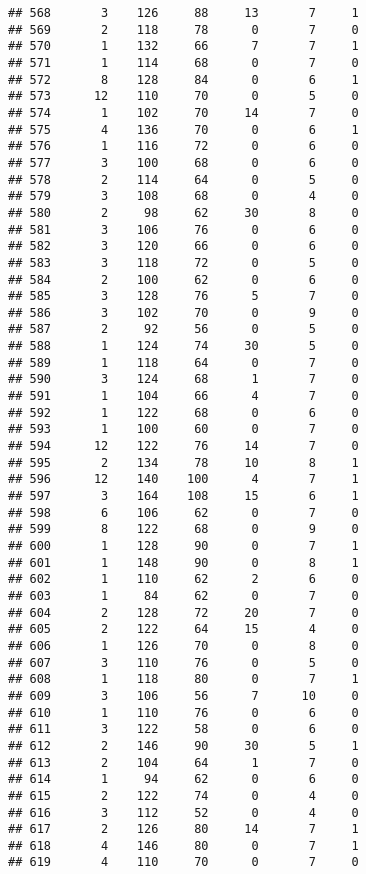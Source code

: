 \documentclass[
]{article}
\begin{document}
\begin{verbatim}
## 568       3    126     88     13       7     1
## 569       2    118     78      0       7     0
## 570       1    132     66      7       7     1
## 571       1    114     68      0       7     0
## 572       8    128     84      0       6     1
## 573      12    110     70      0       5     0
## 574       1    102     70     14       7     0
## 575       4    136     70      0       6     1
## 576       1    116     72      0       6     0
## 577       3    100     68      0       6     0
## 578       2    114     64      0       5     0
## 579       3    108     68      0       4     0
## 580       2     98     62     30       8     0
## 581       3    106     76      0       6     0
## 582       3    120     66      0       6     0
## 583       3    118     72      0       5     0
## 584       2    100     62      0       6     0
## 585       3    128     76      5       7     0
## 586       3    102     70      0       9     0
## 587       2     92     56      0       5     0
## 588       1    124     74     30       5     0
## 589       1    118     64      0       7     0
## 590       3    124     68      1       7     0
## 591       1    104     66      4       7     0
## 592       1    122     68      0       6     0
## 593       1    100     60      0       7     0
## 594      12    122     76     14       7     0
## 595       2    134     78     10       8     1
## 596      12    140    100      4       7     1
## 597       3    164    108     15       6     1
## 598       6    106     62      0       7     0
## 599       8    122     68      0       9     0
## 600       1    128     90      0       7     1
## 601       1    148     90      0       8     1
## 602       1    110     62      2       6     0
## 603       1     84     62      0       7     0
## 604       2    128     72     20       7     0
## 605       2    122     64     15       4     0
## 606       1    126     70      0       8     0
## 607       3    110     76      0       5     0
## 608       1    118     80      0       7     1
## 609       3    106     56      7      10     0
## 610       1    110     76      0       6     0
## 611       3    122     58      0       6     0
## 612       2    146     90     30       5     1
## 613       2    104     64      1       7     0
## 614       1     94     62      0       6     0
## 615       2    122     74      0       4     0
## 616       3    112     52      0       4     0
## 617       2    126     80     14       7     1
## 618       4    146     80      0       7     1
## 619       4    110     70      0       7     0

\end{verbatim}
\end{document}

